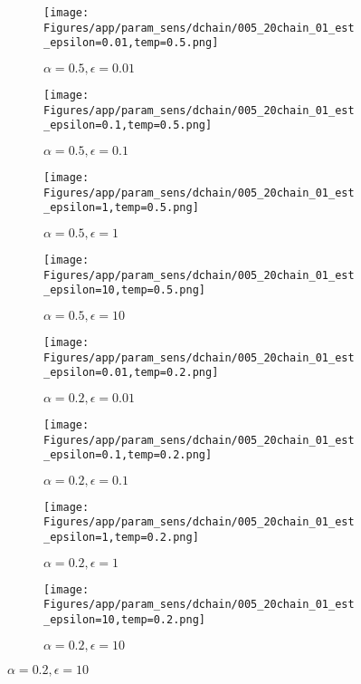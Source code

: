 \documentclass{article}
\theoremstyle{plain}
\begin{document}
\begin{appendices}
\begin{figure}
                \begin{subfigure}[b]{0.24\textwidth}
                    \centering
                    \texttt{[image: Figures/app/param\_sens/dchain/005\_20chain\_01\_est\_epsilon=0.01,temp=0.5.png]}
                    \caption*{$\alpha=0.5,\epsilon=0.01$}
                \end{subfigure}
                \begin{subfigure}[b]{0.24\textwidth}
                    \centering
                    \texttt{[image: Figures/app/param\_sens/dchain/005\_20chain\_01\_est\_epsilon=0.1,temp=0.5.png]}
                    \caption*{$\alpha=0.5,\epsilon=0.1$}
                \end{subfigure}
                \begin{subfigure}[b]{0.24\textwidth}
                    \centering
                    \texttt{[image: Figures/app/param\_sens/dchain/005\_20chain\_01\_est\_epsilon=1,temp=0.5.png]}
                    \caption*{$\alpha=0.5,\epsilon=1$}
                \end{subfigure}
                \begin{subfigure}[b]{0.24\textwidth}
                    \centering
                    \texttt{[image: Figures/app/param\_sens/dchain/005\_20chain\_01\_est\_epsilon=10,temp=0.5.png]}
                    \caption*{$\alpha=0.5,\epsilon=10$}
                \end{subfigure}
                
                \begin{subfigure}[b]{0.24\textwidth}
                    \centering
                    \texttt{[image: Figures/app/param\_sens/dchain/005\_20chain\_01\_est\_epsilon=0.01,temp=0.2.png]}
                    \caption*{$\alpha=0.2,\epsilon=0.01$}
                \end{subfigure}
                \begin{subfigure}[b]{0.24\textwidth}
                    \centering
                    \texttt{[image: Figures/app/param\_sens/dchain/005\_20chain\_01\_est\_epsilon=0.1,temp=0.2.png]}
                    \caption*{$\alpha=0.2,\epsilon=0.1$}
                \end{subfigure}
                \begin{subfigure}[b]{0.24\textwidth}
                    \centering
                    \texttt{[image: Figures/app/param\_sens/dchain/005\_20chain\_01\_est\_epsilon=1,temp=0.2.png]}
                    \caption*{$\alpha=0.2,\epsilon=1$}
                \end{subfigure}
                \begin{subfigure}[b]{0.24\textwidth}
                    \centering
                    \texttt{[image: Figures/app/param\_sens/dchain/005\_20chain\_01\_est\_epsilon=10,temp=0.2.png]}
                    \caption*{$\alpha=0.2,\epsilon=10$}
                \end{subfigure}
                

\end{figure}
\end{appendices}
\end{document}
